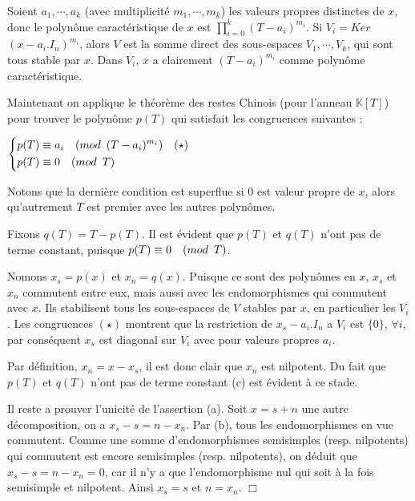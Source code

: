 \documentclass[a4paper,openany,12pt]{report}
\newcommand{\KK}{\mathbb{K}}
\theoremstyle{break}
{\theorembodyfont{\upshape}
\newtheorem*{rmq}{Remarque :}
\newtheorem*{prv}{Preuve :}
\newtheorem*{ex}{Exemples :}
\newtheorem*{exe}{Exemple : }
\newtheorem*{nota}{Notation :}
\newtheorem*{dem}{D\'emonstration :}}
\begin{document}
\begin{prv}
\quad Soient $a_{1},\cdots,a_{k}$ (avec multiplicité $m_{1},\cdots,m_{k}$) les valeurs propres distinctes de $x$, donc le polynôme caractéristique de $x$ est $\prod\limits_{i=0}^k  \left( T-a_{i} \right)^{m_{i}}$. Si $V_{i}=Ker$ $(x-a_{i}.I_{n})^{m_{i}}$, alors $V$ est la somme direct des sous-espaces $V_{1}, \cdots, V_{k}$, qui sont tous stable par $x$. Dans $V_{i}$, $x$ a clairement $(T-a_{i})^{m_{i}}$ comme polynôme caractéristique.

Maintenant on applique le théorème des restes Chinois (pour l'anneau $\KK [T]$) pour trouver le polynôme $p(T)$ qui satisfait les congruences suivantes :
\begin{center}
$
\left\{
\begin{aligned}
p(T) & \equiv a_{i} \quad (mod \enskip (T-a_{i})^{m_{i}}) \quad (\star) \\
p(T) & \equiv 0 \quad (mod \enskip T)
\end{aligned}
\right. $
\end{center}

Notons que la dernière condition est superflue si $0$ est valeur propre de $x$, alors qu'autrement $T$ est premier avec les autres polynômes. 

Fixons $q(T)=T-p(T)$. Il est évident que $p(T)$ et $q(T)$ n'ont pas de terme constant, puisque $p(T) \equiv 0 \quad (mod \enskip T)$.

Nomons $x_{s} = p(x)$ et $x_{n} = q(x)$. Puisque ce sont des polynômes en $x$, $x_{s}$ et $x_{n}$ commutent entre eux, mais aussi avec les endomorphismes qui commutent avec $x$. Ils stabilisent tous les sous-espaces de $V$ stables par $x$, en particulier les $V_{i}$. Les congruences $(\star)$ montrent que la restriction de $x_{s}-a_{i}.I_{n}$ a $V_{i}$ est $\{0\}$, $\forall i$, par conséquent $x_{s}$ est diagonal sur $V_{i}$ avec pour valeurs propres $a_{i}$.

Par définition, $x_{n} = x - x_{s}$, il est donc clair que $x_{n}$ est nilpotent. Du fait que $p(T)$ et $q(T)$ n'ont pas de terme constant (c) est évident à ce stade. 

Il reste a prouver l'unicité de l'assertion (a). Soit $x=s+n$ une autre décomposition, on a $x_{s}-s=n-x_{n}$. Par (b), tous les endomorphismes en vue commutent. Comme une somme d'endomorphismes semisimples (resp. nilpotents) qui commutent est encore semisimples (resp. nilpotents), on déduit que $x_{s}-s=n-x_{n}=0$, car il n'y a que l'endomorphisme nul qui soit à la fois semisimple et nilpotent. Ainsi $x_{s}=s$ et $n =x_{n}$. $\Box$
\end{prv}
\end{document}
